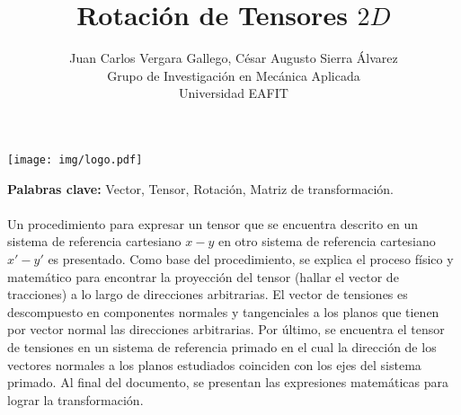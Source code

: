 \documentclass[12pt,letterpaper, twoside, openany]{article}
\author{Juan Carlos Vergara Gallego, César Augusto Sierra Álvarez\\
Grupo de Investigación en Mecánica Aplicada \\ Universidad EAFIT}
\title{\textbf{Rotación de Tensores $2D$}}
\begin{document}
\pagestyle{fancyplain}
\fancyhf{}
\headheight=20pt %
\renewcommand{\headrulewidth}{0pt} %

\lhead %
{
\begin{minipage}{3cm}
\texttt{[image: img/logo.pdf]}
\end{minipage}
}

\fancyfoot[c]{\thepage}

\maketitle


{\bf Palabras clave:} Vector, Tensor, Rotación, Matriz de transformación.\\\\

\abstract
%
Un procedimiento para expresar un tensor que se encuentra descrito en un sistema de referencia cartesiano $x-y$ en otro sistema de referencia cartesiano $x'-y'$ es presentado. Como base del procedimiento, se explica el proceso físico y matemático para encontrar la proyección del tensor (hallar el vector de tracciones) a lo largo de direcciones arbitrarias. El vector de tensiones es descompuesto en componentes normales y tangenciales a los planos que tienen por vector normal las direcciones arbitrarias. Por último, se encuentra el tensor de tensiones en un sistema de referencia primado en el cual la dirección de los vectores normales a los planos estudiados coinciden con los ejes del sistema primado. Al final del documento, se presentan las expresiones matemáticas para lograr la transformación.
%
\end{document}
